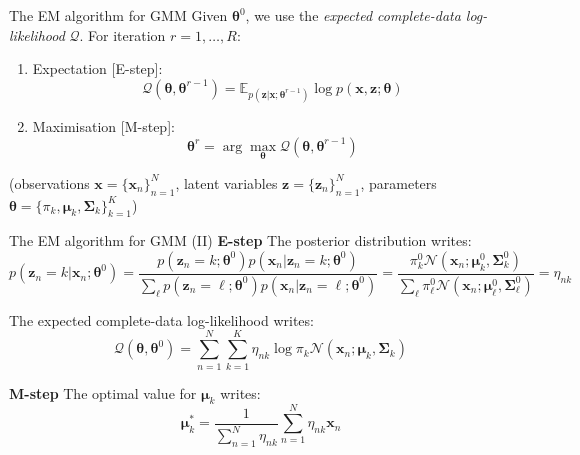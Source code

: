 \documentclass[aspectratio=169]{beamer}
\newcommand{\bs}[1]{\boldsymbol{#1}}
\begin{document}
\begin{frame}{The EM algorithm for GMM}
 Given $\bs{\theta}^0$, we use the \textit{expected complete-data log-likelihood} $\mathcal{Q}$. For iteration $r=1,\ldots,R$:\vspace{2mm}
 \begin{enumerate}
  \item Expectation [E-step]:
  \[ \mathcal{Q}(\bs{\theta},\bs{\theta}^{r-1}) = \mathbb{E}_{p(\bs{z}|\bs{x};\bs{\theta}^{r-1})} \log p(\bs{x},\bs{z};\bs{\theta})\]\vspace{-5mm}
  \item Maximisation [M-step]:
  \[ \bs{\theta}^r = \arg\max_{\bs{\theta}} \mathcal{Q}(\bs{\theta},\bs{\theta}^{r-1})\]
 \end{enumerate}
 {\footnotesize (observations $\bs{x}=\{\bs{x}_n\}_{n=1}^N$, latent variables $\bs{z}=\{\bs{z}_n\}_{n=1}^N$, parameters $\bs{\theta}=\{\pi_k,\bs{\mu}_k,\bs{\Sigma}_k\}_{k=1}^K$)}%

\end{frame}

\begin{frame}{The EM algorithm for GMM (II)}
\textbf{E-step} The posterior distribution writes:
\begin{equation*}
 p(\bs{z}_n=k|\bs{x}_n;\bs{\theta}^0) = \frac{p(\bs{z}_n=k;\bs{\theta}^0)p(\bs{x}_n|\bs{z}_n=k;\bs{\theta}^0)}{\sum_\ell p(\bs{z}_n=\ell;\bs{\theta}^0)p(\bs{x}_n|\bs{z}_n=\ell;\bs{\theta}^0)} =  \frac{\pi_k^0\mathcal{N}(\bs{x}_n;\bs{\mu}_k^0,\bs{\Sigma}_k^0)}{\sum_{\ell}\pi_\ell^0\mathcal{N}(\bs{x}_n;\bs{\mu}_\ell^0,\bs{\Sigma}_\ell^0)} = \eta_{nk}
\end{equation*}\pause

The expected complete-data log-likelihood writes:
\begin{equation*}
 \mathcal{Q}(\bs{\theta},\bs{\theta}^0) = \sum_{n=1}^N\sum_{k=1}^K \eta_{nk} \log \pi_k\mathcal{N}(\bs{x}_n;\bs{\mu}_k,\bs{\Sigma}_k)
\end{equation*}\pause

\textbf{M-step} The optimal value for $\bs{\mu}_k$ writes:
  \[\bs{\mu}_k^*=\frac{1}{\sum_{n=1}^N \eta_{nk}}\sum_{n=1}^N\eta_{nk}\bs{x}_n\]
\end{frame}
\end{document}
